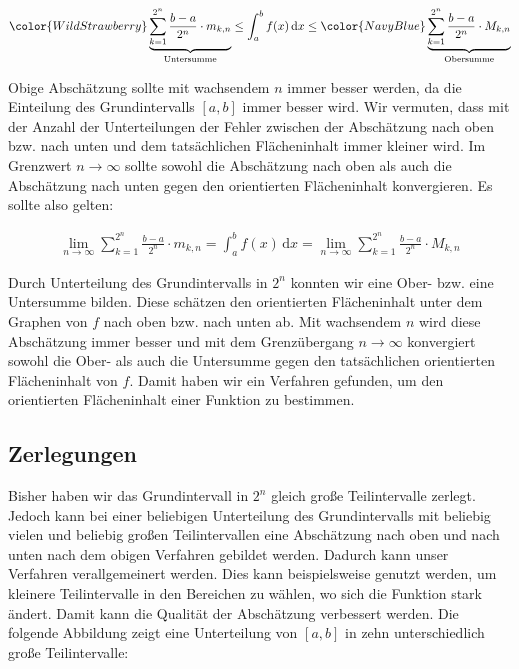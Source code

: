 \documentclass[fontsize=9pt,
               parskip=half-,
               DIV=14,
               listof=chapterentry,
               tocflat]{scrbook}
\begin{document}
\begin{align*}
{\color {WildStrawberry}\underbrace {\sum _{k=1}^{2^{n}}{\frac {b-a}{2^{n}}}\cdot m_{k,n}} _{\text{Untersumme}}}\leq \int _{a}^{b}f(x)\,\mathrm {d} x\leq {\color {NavyBlue}\underbrace {\sum _{k=1}^{2^{n}}{\frac {b-a}{2^{n}}}\cdot M_{k,n}} _{\text{Obersumme}}}
\end{align*}

Obige Abschätzung sollte mit wachsendem $n$ immer besser werden, da die Einteilung des Grundintervalls $[a,b]$ immer besser wird. Wir vermuten, dass mit der Anzahl der Unterteilungen der Fehler zwischen der Abschätzung nach oben bzw. nach unten und dem tatsächlichen Flächeninhalt immer kleiner wird. Im Grenzwert $n\to \infty $ sollte sowohl die Abschätzung nach oben als auch die Abschätzung nach unten gegen den orientierten Flächeninhalt konvergieren. Es sollte also gelten:

\begin{align*}
\lim _{n\to \infty }\sum _{k=1}^{2^{n}}{\frac {b-a}{2^{n}}}\cdot m_{k,n}=\int _{a}^{b}f(x)\,\mathrm {d} x=\lim _{n\to \infty }\sum _{k=1}^{2^{n}}{\frac {b-a}{2^{n}}}\cdot M_{k,n}
\end{align*}

Durch Unterteilung des Grundintervalls in $2^{n}$ konnten wir eine Ober- bzw. eine Untersumme bilden. Diese schätzen den orientierten Flächeninhalt unter dem Graphen von $f$ nach oben bzw. nach unten ab. Mit wachsendem $n$ wird diese Abschätzung immer besser und mit dem Grenzübergang $n\to \infty $ konvergiert sowohl die Ober- als auch die Untersumme gegen den tatsächlichen orientierten Flächeninhalt von $f$. Damit haben wir ein Verfahren gefunden, um den orientierten Flächeninhalt einer Funktion zu bestimmen.

\subsection{Zerlegungen}

Bisher haben wir das Grundintervall in $2^{n}$ gleich große Teilintervalle zerlegt. Jedoch kann bei einer beliebigen Unterteilung des Grundintervalls mit beliebig vielen und beliebig großen Teilintervallen eine Abschätzung nach oben und nach unten nach dem obigen Verfahren gebildet werden. Dadurch kann unser Verfahren verallgemeinert werden. Dies kann beispielsweise genutzt werden, um kleinere Teilintervalle in den Bereichen zu wählen, wo sich die Funktion stark ändert. Damit kann die Qualität der Abschätzung verbessert werden. Die folgende Abbildung zeigt eine Unterteilung von $[a,b]$ in zehn unterschiedlich große Teilintervalle:
\end{document}
